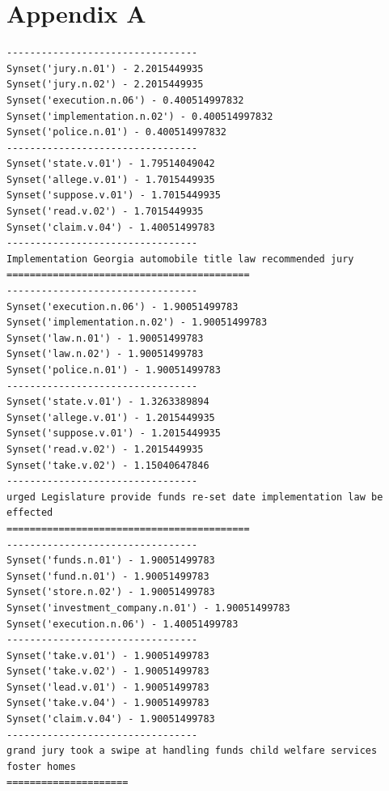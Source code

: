 \documentclass[]{article}
\begin{document}
\section*{Appendix A}
\label{sec:AppA}
\begin{lstlisting}[caption={A trace of the STM throughout runtime}, captionpos=b, label={lst:STMTrace}, basicstyle=\small]
---------------------------------
Synset('jury.n.01') - 2.2015449935
Synset('jury.n.02') - 2.2015449935
Synset('execution.n.06') - 0.400514997832
Synset('implementation.n.02') - 0.400514997832
Synset('police.n.01') - 0.400514997832
---------------------------------
Synset('state.v.01') - 1.79514049042
Synset('allege.v.01') - 1.7015449935
Synset('suppose.v.01') - 1.7015449935
Synset('read.v.02') - 1.7015449935
Synset('claim.v.04') - 1.40051499783
---------------------------------
Implementation Georgia automobile title law recommended jury 
==========================================
---------------------------------
Synset('execution.n.06') - 1.90051499783
Synset('implementation.n.02') - 1.90051499783
Synset('law.n.01') - 1.90051499783
Synset('law.n.02') - 1.90051499783
Synset('police.n.01') - 1.90051499783
---------------------------------
Synset('state.v.01') - 1.3263389894
Synset('allege.v.01') - 1.2015449935
Synset('suppose.v.01') - 1.2015449935
Synset('read.v.02') - 1.2015449935
Synset('take.v.02') - 1.15040647846
---------------------------------
urged Legislature provide funds re-set date implementation law be effected 
==========================================
---------------------------------
Synset('funds.n.01') - 1.90051499783
Synset('fund.n.01') - 1.90051499783
Synset('store.n.02') - 1.90051499783
Synset('investment_company.n.01') - 1.90051499783
Synset('execution.n.06') - 1.40051499783
---------------------------------
Synset('take.v.01') - 1.90051499783
Synset('take.v.02') - 1.90051499783
Synset('lead.v.01') - 1.90051499783
Synset('take.v.04') - 1.90051499783
Synset('claim.v.04') - 1.90051499783
---------------------------------
grand jury took a swipe at handling funds child welfare services foster homes 
=====================

\end{lstlisting}
\end{document}

